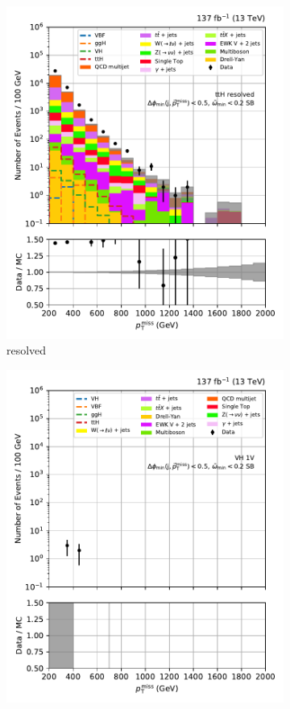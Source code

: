 \begin{figure}[htbp]
\begin{subfigure}[b]{0.24\textwidth}
        \includegraphics[width=\textwidth]{figures/region_plots/full_Run2/sideband_0/ttH_resolved.pdf}
        \caption{\ttH resolved}
    \end{subfigure}
    \hfill
    \begin{subfigure}[b]{0.24\textwidth}
        \includegraphics[width=\textwidth]{figures/region_plots/full_Run2/sideband_0/VH_1V.pdf}

\end{subfigure}
\end{figure}
